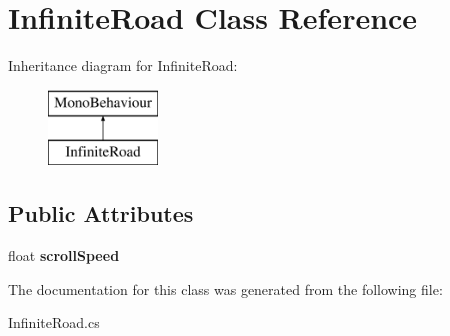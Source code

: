 \hypertarget{class_infinite_road}{}\section{Infinite\+Road Class Reference}
\label{class_infinite_road}
Inheritance diagram for Infinite\+Road\+:\begin{figure}[H]
\begin{center}
\leavevmode
\includegraphics[height=2.000000cm]{class_infinite_road}
\end{center}
\end{figure}
\subsection*{Public Attributes}
\begin{DoxyCompactItemize}
\item 
\mbox{\label{class_infinite_road_a8ec228236d13ed0064b5f29f2f3d6e91}} 
float {\bfseries scroll\+Speed}
\end{DoxyCompactItemize}


The documentation for this class was generated from the following file\+:\begin{DoxyCompactItemize}
\item 
Infinite\+Road.\+cs\end{DoxyCompactItemize}
